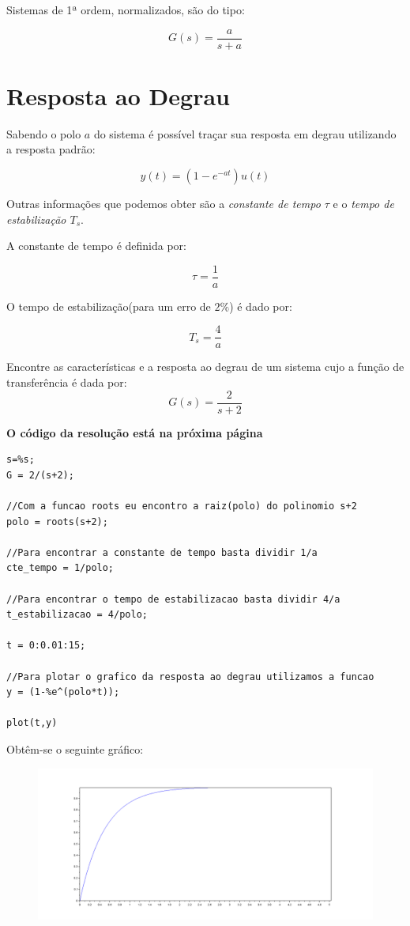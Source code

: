 Sistemas de 1ª ordem, normalizados, são do tipo:

$$G(s) = \frac{a}{s+a}$$

\section{Resposta ao Degrau}

Sabendo o polo $a$ do sistema é possível traçar sua resposta em degrau utilizando a resposta padrão:

$$y(t) = (1 - e^{-at})u(t)$$

Outras informações que podemos obter são a \textit{constante de tempo $\tau$} e o \textit{tempo de estabilização $T_{s}$}.

A constante de tempo é definida por:

$$\tau = \frac{1}{a}$$

O tempo de estabilização(para um erro de $2\%$) é dado por:

$$T_{s} = \frac{4}{a}$$

\begin{example}
Encontre as características e a resposta ao degrau de um sistema cujo a função de transferência é dada por:
$$G(s) = \frac{2}{s+2}$$
\end{example}
\vspace{20mm}
\textbf{O código da resolução está na próxima página}
\newpage

\begin{lstlisting}
s=%s;
G = 2/(s+2);

//Com a funcao roots eu encontro a raiz(polo) do polinomio s+2
polo = roots(s+2);

//Para encontrar a constante de tempo basta dividir 1/a
cte_tempo = 1/polo;

//Para encontrar o tempo de estabilizacao basta dividir 4/a
t_estabilizacao = 4/polo;

t = 0:0.01:15;

//Para plotar o grafico da resposta ao degrau utilizamos a funcao
y = (1-%e^(polo*t));

plot(t,y)

\end{lstlisting}

Obtêm-se o seguinte gráfico:

\begin{figure}[!htb]
\centering
    \includegraphics[scale=0.4]{CapitulosPrincipais/RespTransSistContinuos/Imagens/exemplo1.png}
\end{figure}